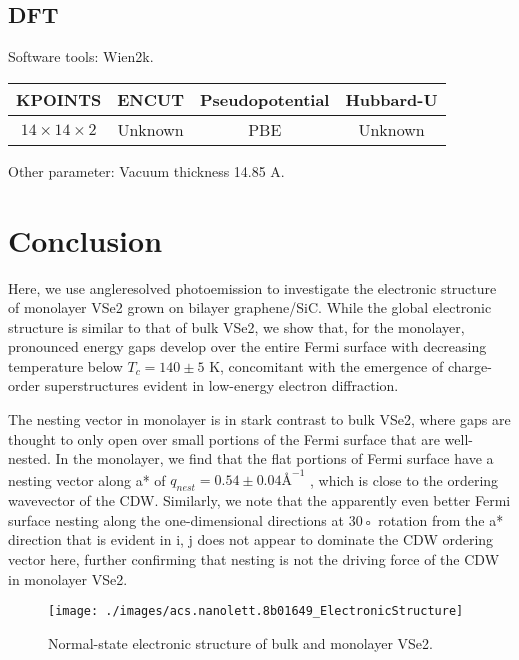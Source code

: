 \subsection{DFT}
Software tools: Wien2k.
\begin{table}[h]
    \begin{tabular}{cccc}
    \toprule
    KPOINTS                 & ENCUT  & Pseudopotential & Hubbard-U \\
    \midrule
    $14 \times 14 \times 2$ & Unknown& PBE             & Unknown   \\
    \bottomrule
    \end{tabular}
\end{table}
Other parameter: Vacuum thickness 14.85 A.
\section{Conclusion}
Here, we use angleresolved photoemission to investigate the electronic structure of monolayer VSe2 grown on bilayer graphene/SiC. While the global electronic structure is similar to that of bulk VSe2, we show that,  for the monolayer, pronounced energy gaps develop over the entire Fermi surface with decreasing temperature below $T_c = 140 \pm 5$ K, concomitant with the emergence of charge-order superstructures evident in low-energy electron diffraction.

The nesting vector in monolayer is in stark contrast to bulk VSe2, where gaps are thought to only open over small portions of the Fermi surface that are well-nested. In the monolayer, we find that the flat portions of Fermi surface have a nesting vector along a* of $q_{nest} = 0.54 ± 0.04 Å^{-1}$ , which is close to the ordering wavevector of the CDW. Similarly, we note that the apparently even better Fermi surface nesting along the one-dimensional directions at 30◦ rotation from the a* direction that is evident in i, j does not appear to dominate the CDW ordering vector here, further confirming that nesting is not the driving force of the CDW in monolayer VSe2.
\begin{figure}[ht] 
    \texttt{[image: ./images/acs.nanolett.8b01649\_ElectronicStructure]}
	\caption[Normal-state electronic structure of bulk and monolayer VSe2]{
		Normal-state electronic structure of bulk and monolayer VSe2.
	}
\end{figure}

